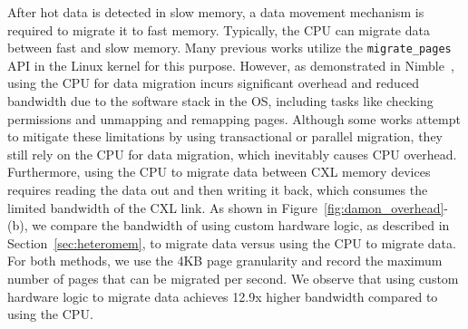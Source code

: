 

After hot data is detected in slow memory, a data movement mechanism is required to migrate it to fast memory. Typically, the CPU can migrate data between fast and slow memory. 
Many previous works utilize the \texttt{migrate\_pages} API in the Linux kernel for this purpose. 
However, as demonstrated in Nimble~\cite{nimble_asplos19}, using the CPU for data migration incurs significant overhead and reduced bandwidth due to the software stack in the OS, including tasks like checking permissions and unmapping and remapping pages. Although some works attempt to mitigate these limitations by using transactional or parallel migration, they still rely on the CPU for data migration, which inevitably causes CPU overhead. Furthermore, using the CPU to migrate data between CXL memory devices requires reading the data out and then writing it back, which consumes the limited bandwidth of the CXL link.
As shown in Figure~\ref{fig:damon_overhead}-(b), we compare the bandwidth of using custom hardware logic, as described in Section~\ref{sec:heteromem}, to migrate data versus using the CPU to migrate data. For both methods, we use the 4KB page granularity and record the maximum number of pages that can be migrated per second. We observe that using custom hardware logic to migrate data achieves 12.9x higher bandwidth compared to using the CPU. 




